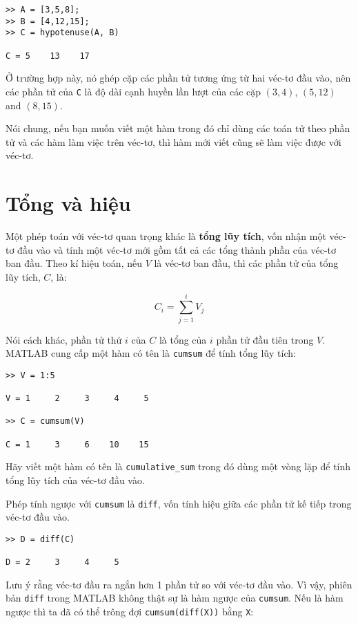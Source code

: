 \documentclass[12pt]{book}
\begin{document}
\begin{verbatim}
>> A = [3,5,8];
>> B = [4,12,15];
>> C = hypotenuse(A, B)

C = 5    13    17
\end{verbatim}
Ở trường hợp này, nó ghép cặp các phần tử tương ứng từ hai
véc-tơ đầu vào, nên các phần tử của {\tt C} là độ dài cạnh huyền
lần lượt của các cặp $(3,4)$, $(5,12)$ and $(8,15)$.

Nói chung, nếu bạn muốn viết một hàm trong đó chỉ dùng các toán tử
theo phần tử và các hàm làm việc trên véc-tơ, thì hàm mới viết cũng
sẽ làm việc được với véc-tơ.


\section{Tổng và hiệu}

Một phép toán với véc-tơ quan trọng khác là {\bf tổng lũy tích}, vốn
nhận một véc-tơ đầu vào và tính một véc-tơ mới gồm tất cả các tổng
thành phần của véc-tơ ban đầu. Theo kí hiệu toán, nếu $V$ là véc-tơ
ban đầu, thì các phần tử của tổng lũy tích, $C$, là:

\[ C_i = \sum_{j=1}^i V_j \]

Nói cách khác, phần tử thứ $i$ của $C$ là tổng của 
$i$ phần tử đầu tiên trong $V$.  MATLAB cung cấp một hàm có tên
là {\tt cumsum} để tính tổng lũy tích:

\begin{verbatim}
>> V = 1:5

V = 1     2     3     4     5

>> C = cumsum(V)

C = 1     3     6    10    15
\end{verbatim}
%
\begin{ex}
Hãy viết một hàm có tên là \verb#cumulative_sum# trong đó dùng
một vòng lặp để tính tổng lũy tích của véc-tơ đầu vào.
\end{ex}

Phép tính ngược với {\tt cumsum} là {\tt diff}, vốn tính hiệu giữa
các phần tử kế tiếp trong véc-tơ đầu vào.

\begin{verbatim}
>> D = diff(C)

D = 2     3     4     5
\end{verbatim}
%
Lưu ý rằng véc-tơ đầu ra ngắn hơn 1 phần tử so với véc-tơ đầu vào.
Vì vậy, phiên bản {\tt diff} trong MATLAB không thật sự là hàm ngược
của {\tt cumsum}. Nếu là hàm ngược thì ta đã có thể trông đợi 
{\tt cumsum(diff(X))} bằng {\tt X}:
\end{document}
